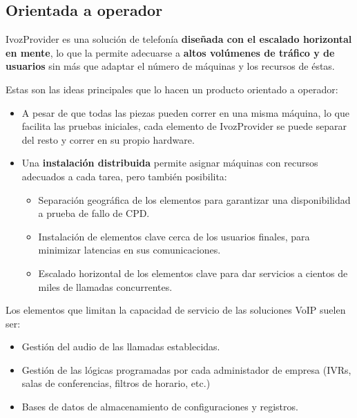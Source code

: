\documentclass[letterpaper,10pt,spanish]{sphinxmanual}
\begin{document}
\subsection{Orientada a operador}
\label{intro/what_is_ivozprovider:operator-oriented}\label{intro/what_is_ivozprovider:orientada-a-operador}
IvozProvider es una solución de telefonía \textbf{diseñada con el escalado horizontal en mente}, lo que la permite adecuarse a \textbf{altos volúmenes de tráfico y de usuarios} sin más que adaptar el número de máquinas y los recursos de éstas.

Estas son las ideas principales que lo hacen un producto orientado a operador:
\begin{itemize}
\item {} 
A pesar de que todas las piezas pueden correr en una misma máquina, lo que facilita las pruebas iniciales, cada elemento de IvozProvider se puede separar del resto y correr en su propio hardware.

\item {} 
Una \textbf{instalación distribuida} permite asignar máquinas con recursos adecuados a cada tarea, pero también posibilita:
\begin{itemize}
\item {} 
Separación geográfica de los elementos para garantizar una disponibilidad a prueba de fallo de CPD.

\item {} 
Instalación de elementos clave cerca de los usuarios finales, para minimizar latencias en sus comunicaciones.

\item {} 
Escalado horizontal de los elementos clave para dar servicios a cientos de miles de llamadas concurrentes.

\end{itemize}

\end{itemize}

Los elementos que limitan la capacidad de servicio de las soluciones VoIP suelen ser:
\begin{itemize}
\item {} 
Gestión del audio de las llamadas establecidas.

\item {} 
Gestión de las lógicas programadas por cada administador de empresa (IVRs, salas de conferencias, filtros de horario, etc.)

\item {} 
Bases de datos de almacenamiento de configuraciones y registros.

\end{itemize}
\end{document}
